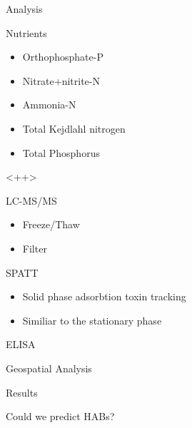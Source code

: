 \begin{frame}{Analysis}

\end{frame}

\begin{frame}{Nutrients}
	\begin{itemize}
		\item Orthophosphate-P 
		\item Nitrate+nitrite-N
		\item Ammonia-N 
		\item Total Kejdlahl nitrogen 
		\item Total Phosphorus
	\end{itemize}

	<++>

\end{frame}

\begin{frame}{LC-MS/MS}
	\begin{itemize}
		\item Freeze/Thaw
		\item Filter
	\end{itemize}

\end{frame}

\begin{frame}{SPATT}

	\begin{itemize}
		\item Solid phase adsorbtion toxin tracking
		\item Similiar to the stationary phase
	\end{itemize}

\end{frame}
\begin{frame}{ELISA}

\end{frame}

\begin{frame}{Geospatial Analysis}

\end{frame}
\begin{frame}{Results}

\end{frame}
\begin{frame}{Could we predict HABs?}

\end{frame}

